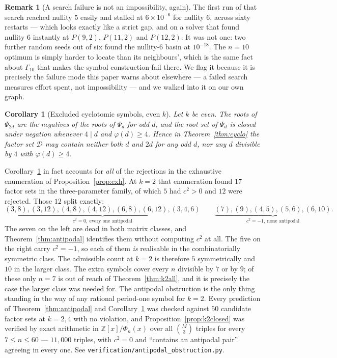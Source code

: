 \documentclass[11pt]{article}
\newtheorem{corollary}[theorem]{Corollary}
\theoremstyle{definition}
\newtheorem{remark}[theorem]{Remark}
\begin{document}
\begin{remark}[A search failure is not an impossibility, again]
The first run of that search reached nullity $5$ easily and stalled at
$6\times10^{-6}$ for nullity $6$, across sixty restarts --- which looks exactly
like a strict gap, and on a solver that found nullity $6$ instantly at
$P(9,2)$, $P(11,2)$ and $P(12,2)$. It was not one: two further random seeds
out of six found the nullity-$6$ basin at $10^{-18}$. The $n=10$ optimum is
simply harder to locate than its neighbours', which is the same fact about
$\Gamma_{10}$ that makes the symbol construction fail there. We flag it because
it is precisely the failure mode this paper warns about elsewhere --- a failed
search measures effort spent, not impossibility --- and we walked into it on our
own graph.
\end{remark}

\begin{corollary}[Excluded cyclotomic symbols, even $k$]\label{cor:excluded}
Let $k$ be even. The roots of $\Psi_{2d}$ are the negatives of the roots of
$\Psi_d$ for odd $d$, and the root set of $\Psi_d$ is closed under negation
whenever $4\mid d$ and $\varphi(d)\ge4$. Hence in Theorem~\ref{thm:cyclo} the
factor set $\mathcal D$ may contain neither both $d$ and $2d$ for any odd $d$, nor any
$d$ divisible by $4$ with $\varphi(d)\ge4$.
\end{corollary}

\noindent
Corollary~\ref{cor:excluded} in fact accounts for \emph{all} of the rejections
in the exhaustive enumeration of Proposition~\ref{prop:exh}. At $k=2$ that
enumeration found $17$ factor sets in the three-parameter family, of which $5$
had $c^{2}>0$ and $12$ were rejected. Those $12$ split exactly:
\[
  \underbrace{(3,8),(3,12),(4,8),(4,12),(6,8),(6,12),(3,4,6)}_{c^{2}=0,\ \text{every one antipodal}}
  \qquad
  \underbrace{(7),(9),(4,5),(5,6),(6,10)}_{c^{2}=-1,\ \text{none antipodal}} .
\]
The seven on the left are dead in both matrix classes, and
Theorem~\ref{thm:antipodal} identifies them without computing $c^{2}$ at all.
The five on the right carry $c^{2}=-1$, so each of them \emph{is} realisable
in the combinatorially symmetric class. The admissible count at $k=2$ is
therefore $5$ symmetrically and $10$ in the larger class. The extra symbols
cover every $n$ divisible by $7$ or by $9$; of these only $n=7$ is out of reach
of Theorem~\ref{thm:k2all}, and it is precisely the case the larger class was
needed for. The antipodal obstruction is
the only thing standing in the way of any rational period-one symbol for
$k=2$. Every prediction of
Theorem~\ref{thm:antipodal} and Corollary~\ref{cor:excluded} was checked
against $50$ candidate factor sets at $k=2,4$ with no violation, and
Proposition~\ref{prop:k2closed} was verified by exact arithmetic in
$\mathbb Z[x]/\Phi_n(x)$ over all $\binom{M}{3}$ triples for every
$7\le n\le60$ --- $11{,}000$ triples, with $c^{2}=0$ and ``contains an
antipodal pair'' agreeing in every one. See
\texttt{verification/antipodal\_obstruction.py}.
\end{document}
